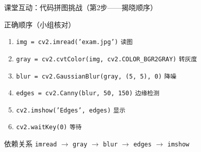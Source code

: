 \begin{frame}[fragile]{课堂互动：代码拼图挑战（第2步——揭晓顺序）}
    \begin{block}{正确顺序（小组核对）}
        \begin{enumerate}
            \item \texttt{img = cv2.imread('exam.jpg')} \hfill \texttt{读图} \\
            \item \texttt{gray = cv2.cvtColor(img, cv2.COLOR\_BGR2GRAY)} \hfill \texttt{转灰度} \\
            \item \texttt{blur = cv2.GaussianBlur(gray, (5, 5), 0)} \hfill \texttt{降噪} \\
            \item \texttt{edges = cv2.Canny(blur, 50, 150)} \hfill \texttt{边缘检测} \\
            \item \texttt{cv2.imshow('Edges', edges)} \hfill \texttt{显示} \\
            \item \texttt{cv2.waitKey(0)} \hfill \texttt{等待}
        \end{enumerate}
    \end{block}

    \pause

    \begin{uncoverenv}
        \begin{block}{依赖关系}
            \texttt{imread} $\xrightarrow{}$ \texttt{gray} $\xrightarrow{}$ \texttt{blur} $\xrightarrow{}$ \texttt{edges} $\xrightarrow{}$ \texttt{imshow}
        \end{block}
    \end{uncoverenv}
\end{frame}

